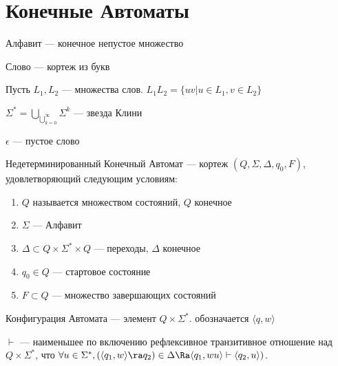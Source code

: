 
\section{Конечные Автоматы}
\begin{definition}
    Алфавит --- конечное непустое множество
\end{definition}

\begin{definition}
    Слово --- кортеж из букв
\end{definition}

\begin{definition}
    Пусть \(L_1, L_2\) --- множества слов. \(L_1L_2 = \{uv | u \in L_1, v \in L_2\}\)
\end{definition}

\begin{definition}
    \(\Sigma^* = \bigcup_{\bigcup_{k = 0}^\infty} \Sigma^k\) --- звезда Клини
\end{definition}

\begin{definition}
    \(\epsilon\) --- пустое слово
\end{definition}

\begin{definition}
    Недетерминированный Конечный Автомат --- кортеж \((Q, \Sigma, \Delta, q_0, F)\), удовлетворяющий следующим условиям:
    \begin{enumerate}
        \item \(Q\) называется множеством состояний, \(Q\) конечное
        \item \(\Sigma\) --- Алфавит
        \item \(\Delta \subset Q \times \Sigma^* \times Q\) --- переходы, \(\Delta\) конечное
        \item \(q_0 \in Q\) --- стартовое состояние
        \item \(F \subset Q\) --- множество завершающих состояний
    \end{enumerate}
\end{definition}

\begin{definition}
    Конфигурация Автомата --- элемент \(Q \times \Sigma^*\). обозначается \(\langle q, w\rangle\)
\end{definition}

\begin{definition}
    \(\vdash\) --- наименьшее по включению рефлексивное транзитивное отношение над \(Q \times \Sigma^*\), что \(\forall u \in \Sigma^*, (\langle q_1, w \rangle \ra q_2) \in \Delta \Ra \langle q_1, wu\rangle \vdash \langle q_2, u\rangle)\).
\end{definition}

